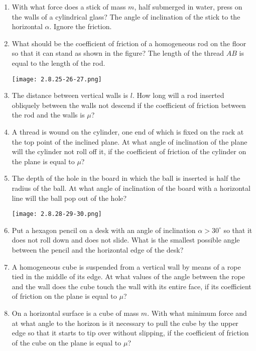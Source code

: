 \documentclass{article}
\begin{document}
\begin{enumerate}[label=2.8.\arabic*]
\item With what force does a stick of mass $m$, half submerged in water, press on the walls of a cylindrical glass? The angle of inclination of the stick to the horizontal $\alpha$. Ignore the friction.

\item What should be the coefficient of friction of a homogeneous rod on the floor so that it can stand as shown in the figure? The length of the thread $AB$ is equal to the length of the rod.

\begin{center}
    \texttt{[image: 2.8.25-26-27.png]}
\end{center}

\item The distance between vertical walls is $l$. How long will a rod inserted obliquely between the walls not descend if the coefficient of friction between the rod and the walls is $\mu$?

\item A thread is wound on the cylinder, one end of which is fixed on the rack at the top point of the inclined plane. At what angle of inclination of the plane will the cylinder not roll off it, if the coefficient of friction of the cylinder on the plane is equal to $\mu$?

\item The depth of the hole in the board in which the ball is inserted is half the radius of the ball. At what angle of inclination of the board with a horizontal line will the ball pop out of the hole?

\begin{center}
    \texttt{[image: 2.8.28-29-30.png]}
\end{center}

\item Put a hexagon pencil on a desk with an angle of inclination $\alpha > 30^\circ$ so that it does not roll down and does not slide. What is the smallest possible angle between the pencil and the horizontal edge of the desk?

\item A homogeneous cube is suspended from a vertical wall by means of a rope tied in the middle of its edge. At what values of the angle between the rope and the wall does the cube touch the wall with its entire face, if its coefficient of friction on the plane is equal to $\mu$?

\item On a horizontal surface is a cube of mass $m$. With what minimum force and at what angle to the horizon is it necessary to pull the cube by the upper edge so that it starts to tip over without slipping, if the coefficient of friction of the cube on the plane is equal to $\mu$?


\end{enumerate}
\end{document}
